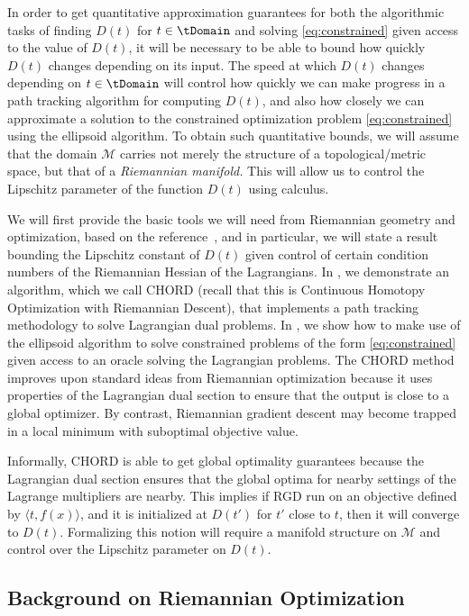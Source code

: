 \documentclass{article}
\numberwithin{equation}{section}
\newcommand{\cM}{{\mathcal{M}}}
\begin{document}
In order to get quantitative approximation guarantees for both the algorithmic tasks of finding $D(t)$ for $t \in \tDomain$ and solving \eqref{eq:constrained} given access to the value of $D(t)$,  
it will be necessary to be able to bound how quickly $D(t)$ changes depending on its input. The speed at which $D(t)$ changes depending on $t \in \tDomain$ will control how quickly we can make progress in a path tracking algorithm for computing $D(t)$, and also how closely we can approximate a solution to the constrained optimization problem \eqref{eq:constrained} using the ellipsoid algorithm.
To obtain such quantitative bounds, we will assume that the domain $\cM$ carries not merely the structure of a topological/metric space, but that of a \emph{Riemannian manifold.} This will allow us to control the Lipschitz parameter of the function $D(t)$ using calculus.


We will first provide the basic tools we will need from Riemannian geometry and optimization, based on the reference~\cite{boumal}, and in particular, we will state a result bounding the Lipschitz constant of $D(t)$ given control of certain condition numbers of the Riemannian Hessian of the Lagrangians.
In , we demonstrate an algorithm, which we call CHORD (recall that this is Continuous Homotopy Optimization with Riemannian Descent), that implements a path tracking methodology to solve Lagrangian dual problems.
In , we show how to make use of the ellipsoid algorithm to solve constrained problems of the form \eqref{eq:constrained} given access to an oracle solving the Lagrangian problems.
The CHORD method improves upon standard ideas from Riemannian optimization because it uses properties of the Lagrangian dual section to ensure that the output is close to a global optimizer.
By contrast, Riemannian gradient descent may become trapped in a local minimum with suboptimal objective value. 

Informally, CHORD is able to get global optimality guarantees because the Lagrangian dual section ensures that the global optima for nearby settings of the Lagrange multipliers are nearby. This implies if RGD run on an objective defined by $\langle t, f(x)\rangle$, and it is initialized at $D(t')$ for $t'$ close to $t$, then it will converge to $D(t)$. Formalizing this notion will require a manifold structure on $\cM$ and control over the Lipschitz parameter on $D(t)$.


\subsection{Background on Riemannian Optimization}
\label{subsec:riemannian}
\end{document}
